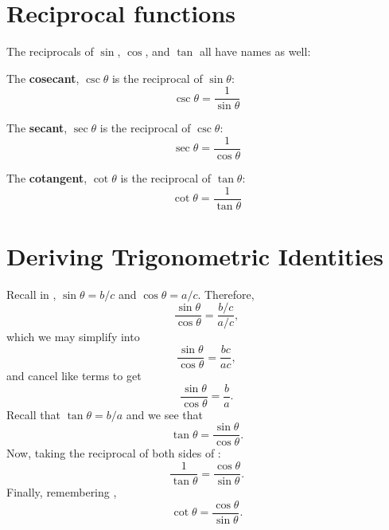 \section{Reciprocal functions}
The reciprocals of $\sin$, $\cos$, and $\tan$ all have names as well:
\begin{defn}
    The \textbf{cosecant}, $\csc \theta$ is the reciprocal of $\sin \theta$:
    \begin{equation}
        \csc \theta = \frac{1}{\sin \theta}
        \label{eq:cosecant}
    \end{equation}
\end{defn}
\begin{defn}
    The \textbf{secant}, $\sec \theta$ is the reciprocal of $\csc \theta$:
    \begin{equation}
        \sec \theta = \frac{1}{\cos \theta}
        \label{eq:secant}
    \end{equation}
\end{defn}
\begin{defn}
    The \textbf{cotangent}, $\cot \theta$ is the reciprocal of $\tan \theta$:
    \begin{equation}
        \cot \theta = \frac{1}{\tan \theta}
        \label{eq:cotangent}
    \end{equation}
\end{defn}

\section{Deriving Trigonometric Identities}\label{sec:trigderiv}
Recall in , $\sin \theta = b/c$ and $\cos \theta = a/c$.
Therefore,
\begin{equation*}
    \frac{\sin \theta}{\cos \theta} = \dfrac{b/c}{a/c},
\end{equation*}
which we may simplify into
\begin{equation*}
    \frac{\sin \theta}{\cos \theta} = \dfrac{bc}{ac},
\end{equation*}
and cancel like terms to get
\begin{equation*}
    \frac{\sin\theta}{\cos\theta}=\dfrac{b}{a}.
\end{equation*}
Recall that $\tan \theta = b/a$ and we see that
\begin{equation}
    \tan\theta = \frac{\sin \theta}{\cos \theta}.
    \label{eq:found_tangent}
\end{equation}
Now, taking the reciprocal of both sides of :
\begin{equation*}
    \frac{1}{\tan \theta} = \frac{\cos \theta}{\sin \theta}.
\end{equation*}
Finally, remembering ,
\begin{equation}
    \cot \theta = \frac{\cos \theta}{\sin \theta}.
    \label{eq:found_cotangent}
\end{equation}

